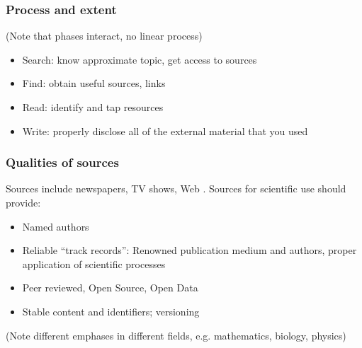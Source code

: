 \documentclass[]{beamer} %
\begin{document}
\begin{frame}
\frametitle{Process and extent}
(Note that phases interact, no linear process)
\begin{itemize}
	\item Search: know approximate topic, get access to sources
	\item Find: obtain useful sources, links
	\item Read: identify and tap resources
	\item Write: properly disclose all of the external material that you used
\end{itemize}
\end{frame}

\begin{frame}
\frametitle{Qualities of sources}
\small
Sources include newspapers, TV shows, Web \cite{sacred-heart}. Sources for scientific use should provide:

\begin{itemize}
	\item Named authors
	\item Reliable ``track records'': Renowned publication medium and authors, proper application of scientific processes
	\item Peer reviewed, Open Source, Open Data
	\item Stable content and identifiers; versioning
\end{itemize}
(Note different emphases in different fields, e.g. mathematics, biology, physics)
\end{frame}
\end{document}
